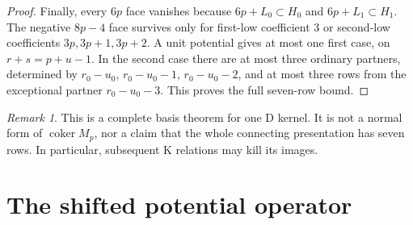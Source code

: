 \documentclass[11pt]{article}
\theoremstyle{definition}
\theoremstyle{remark}
\newtheorem{remark}[theorem]{Remark}
\newcommand{\coker}{\operatorname{coker}}
\begin{document}
\begin{proof}
Finally, every $6p$ face vanishes because
$6p+L_0\subset H_0$ and $6p+L_1\subset H_1$.
The negative $8p-4$ face survives only for first-low coefficient 3
or second-low coefficients $3p,3p+1,3p+2$. A unit potential gives at
most one first case, on $r+s=p+u-1$. In the second case there are at
most three ordinary partners, determined by $r_0-u_0$, $r_0-u_0-1$,
$r_0-u_0-2$, and at most three rows from the exceptional partner
$r_0-u_0-3$. This proves the full seven-row bound.
\end{proof}

\begin{remark}
This is a complete basis theorem for one D kernel. It is not a normal form
of $\coker M_p$, nor a claim that the whole connecting presentation has
seven rows. In particular, subsequent K relations may kill its images.
\end{remark}

\section{The shifted potential operator}\label{sec:shift}
\end{document}
